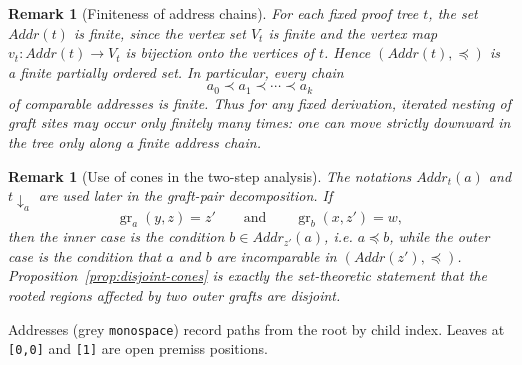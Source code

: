 \documentclass[11pt]{article}
\newtheorem{remark}[theorem]{Remark}
\newcommand{\ms}{\mathrel{\mid\!\sim}}
\newcommand{\mszero}{\mathrel{\mid\!\sim_{0}}}
\newcommand{\Addr}{\mathit{Addr}}
\newcommand{\graftat}[3]{\operatorname{gr}_{#2}(#3,#1)}
\begin{document}
\begin{remark}[Finiteness of address chains]
For each fixed proof tree \(t\), the set \(\Addr(t)\) is finite, since the
vertex set \(V_t\) is finite and the vertex map \(v_t:\Addr(t)\to V_t\) is
bijection onto the vertices of \(t\). Hence \((\Addr(t),\preceq)\) is a finite
partially ordered set. In particular, every chain
\[
a_0 \prec a_1 \prec \cdots \prec a_k
\]
of comparable addresses is finite. Thus for any fixed derivation, iterated
nesting of graft sites may occur only finitely many times: one can move
strictly downward in the tree only along a finite address chain.
\end{remark}

\begin{remark}[Use of cones in the two-step analysis]
The notations \(\Addr_t(a)\) and \(t\downarrow_a\) are used later in the
graft-pair decomposition. If
\[
\graftat{z}{a}{y}=z'
\qquad\text{and}\qquad
\graftat{z'}{b}{x}=w,
\]
then the \emph{inner} case is the condition \(b\in \Addr_{z'}(a)\), i.e.
\(a\preceq b\), while the \emph{outer} case is the condition that \(a\) and
\(b\) are incomparable in \((\Addr(z'),\preceq)\). Proposition~\ref{prop:disjoint-cones} is exactly
the set-theoretic statement that the rooted regions affected by two outer
grafts are disjoint.
\end{remark}

\begin{center}
\end{center}
\noindent\small
Addresses (grey \texttt{monospace}) record paths from the root by child index.
Leaves at \texttt{[0,0]} and \texttt{[1]} are open premiss positions.
\end{document}
